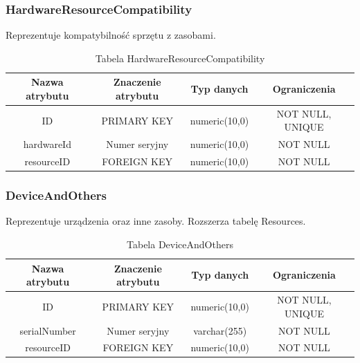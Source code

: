 \subsubsection{HardwareResourceCompatibility}
Reprezentuje kompatybilność sprzętu z zasobami.
\begin{table}[H]
	\renewcommand\arraystretch{1.5}
	\renewcommand\tabcolsep{3pt}
	\begin{tabular}{| c | c | c | c |} 
		\hline \textbf{Nazwa atrybutu} & \textbf{Znaczenie atrybutu} & \textbf{Typ danych} & \textbf{Ograniczenia} \\ 
		\hline ID & PRIMARY KEY & numeric(10,0) & NOT NULL, UNIQUE \\ 
		\hline hardwareId & Numer seryjny & numeric(10,0) & NOT NULL \\ 
		\hline resourceID & FOREIGN KEY & numeric(10,0) & NOT NULL \\ 
		\hline 
	\end{tabular} 
	\caption{Tabela HardwareResourceCompatibility}
	\label{TAB:HardwareResourceCompatibility}
\end{table}

\subsubsection{DeviceAndOthers}
Reprezentuje urządzenia oraz inne zasoby. Rozszerza tabelę Resources.
\begin{table}[H]
	\renewcommand\arraystretch{1.5}
	\renewcommand\tabcolsep{3pt}
	\begin{tabular}{| c | c | c | c |} 
		\hline \textbf{Nazwa atrybutu} & \textbf{Znaczenie atrybutu} & \textbf{Typ danych} & \textbf{Ograniczenia} \\ 
		\hline ID & PRIMARY KEY & numeric(10,0) & NOT NULL, UNIQUE \\ 
		\hline serialNumber & Numer seryjny & varchar(255) & NOT NULL \\ 
		\hline resourceID & FOREIGN KEY & numeric(10,0) & NOT NULL \\ 
		\hline 
	\end{tabular} 
	\caption{Tabela DeviceAndOthers}
	\label{TAB:DeviceAndOthers}
\end{table}

